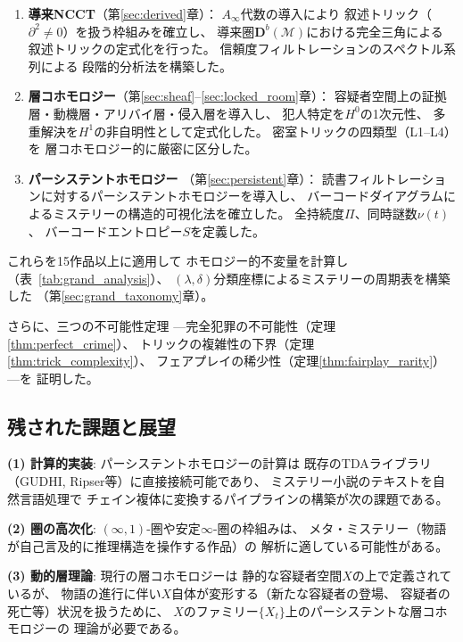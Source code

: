 \documentclass[12pt,twocolumn]{ltjsarticle}
\newcommand{\Mys}{\mathcal{M}}
\newcommand{\Db}{\mathbf{D}^b}
\begin{document}
\begin{enumerate}
\item \textbf{導来NCCT}（第\ref{sec:derived}章）：
$A_\infty$代数の導入により
叙述トリック（$\partial^2 \neq 0$）を扱う枠組みを確立し、
導来圏$\Db(\Mys)$における完全三角による
叙述トリックの定式化を行った。
信頼度フィルトレーションのスペクトル系列による
段階的分析法を構築した。

\item \textbf{層コホモロジー}（第\ref{sec:sheaf}--\ref{sec:locked_room}章）：
容疑者空間上の証拠層・動機層・アリバイ層・侵入層を導入し、
犯人特定を$H^0$の1次元性、
多重解決を$H^1$の非自明性として定式化した。
密室トリックの四類型（L1--L4）を
層コホモロジー的に厳密に区分した。

\item \textbf{パーシステントホモロジー}
（第\ref{sec:persistent}章）：
読書フィルトレーションに対するパーシステントホモロジーを導入し、
バーコードダイアグラムによるミステリーの構造的可視化法を確立した。
全持続度$\Pi$、同時謎数$\nu(t)$、
バーコードエントロピー$S$を定義した。
\end{enumerate}

これらを15作品以上に適用して
ホモロジー的不変量を計算し（表~\ref{tab:grand_analysis}）、
$(\lambda, \delta)$分類座標によるミステリーの周期表を構築した
（第\ref{sec:grand_taxonomy}章）。

さらに、三つの不可能性定理
---完全犯罪の不可能性（定理\ref{thm:perfect_crime}）、
トリックの複雑性の下界（定理\ref{thm:trick_complexity}）、
フェアプレイの稀少性（定理\ref{thm:fairplay_rarity}）---を
証明した。

\subsection{残された課題と展望}

\textbf{(1) 計算的実装}:
パーシステントホモロジーの計算は
既存のTDAライブラリ（GUDHI, Ripser等）に直接接続可能であり、
ミステリー小説のテキストを自然言語処理で
チェイン複体に変換するパイプラインの構築が次の課題である。

\textbf{(2) 圏の高次化}:
$(\infty, 1)$-圏や安定$\infty$-圏の枠組みは、
メタ・ミステリー（物語が自己言及的に推理構造を操作する作品）の
解析に適している可能性がある。

\textbf{(3) 動的層理論}:
現行の層コホモロジーは
静的な容疑者空間$X$の上で定義されているが、
物語の進行に伴い$X$自体が変形する（新たな容疑者の登場、
容疑者の死亡等）状況を扱うために、
$X$のファミリー$\{X_t\}$上のパーシステントな層コホモロジーの
理論が必要である。
\end{document}
